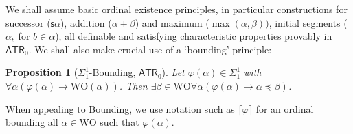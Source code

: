 \documentclass[10pt,a4paper]{amsart}
\theoremstyle{plain}
\newtheorem{proposition}[proposition]{Proposition}
\theoremstyle{definition}
\newtheorem{remark}[remark]{Remark}
\renewcommand{\phi}{\varphi}
\newcommand{\anupam}[1]{\todo[color=green]{A: #1}}
\renewcommand{\todo}[1]{}
\renewcommand{\anupam}[1]{}
\theoremstyle{plain}
\theoremstyle{definition} %
\renewcommand{\succ}{\mathsf s}
\newcommand{\limp}{\to}
\newcommand{\Sin}[2]{\Sigma^{#1}_{#2}}
\newcommand{\ATR}{\mathsf{ATR}}
\newcommand{\WO}{\mathrm{WO}}
\newcommand{\ordleq}{\preceq}
\newcommand{\upbnd}[1]{\lceil #1\rceil}
\newcommand{\oper}[3]{\Lambda #1 \lambda #2 \, #3}
\newcommand{\operatorvar}{\mathcal X}
\newcommand{\operatorvari}{\mathcal Y}
\newcommand{\hr}[1]{|#1|}
\newcommand{\HR}{\hr \cdot}
\begin{document}

We shall assume basic ordinal existence principles, in particular constructions for successor ($\succ \alpha$), addition ($\alpha + \beta$) and maximum ($\max(\alpha,\beta))$, initial segments ($\alpha_b$ for $b\in \alpha$), all definable and satisfying characteristic properties provably in $\ATR_0$.
We shall also make crucial use of a `bounding' principle:
\begin{proposition}
    [$\Sin 1 1 $-Bounding, $\ATR_0$]
    \label{prop:bounding}
    Let $\phi(\alpha) \in \Sin 1 1 $ with $\forall \alpha  (\phi(\alpha)\limp \WO(\alpha))$. 
    Then $\exists \beta \in \WO \forall \alpha (\phi(\alpha) \limp \alpha \ordleq \beta)$.
\end{proposition}
When appealing to Bounding, we use notation such as $\upbnd \phi$ for an ordinal bounding all $\alpha \in \WO$ such that $\phi(\alpha)$.


\anupam{commented positive combinations of operators section below. Now obsolete.}




\end{document}
